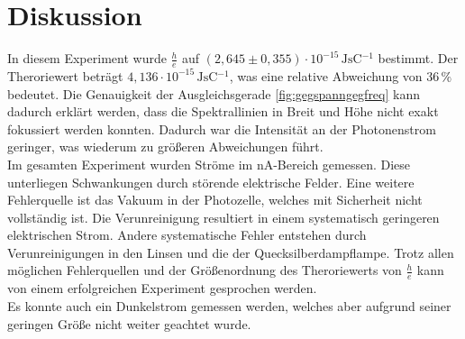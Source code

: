 \section{Diskussion}
\label{sec:Diskussion}

In diesem Experiment wurde $ \frac{h}{e}$ auf $(2,645 \pm 0,355) \cdot 10^{-15} \,\si{\joule\second\coulomb^{-1}}$ bestimmt.
Der Theroriewert beträgt $4,136 \cdot 10^{-15} \,\si{\joule\second\coulomb^{-1}}$, was eine relative Abweichung von $36 \, \%$ bedeutet. Die Genauigkeit der Ausgleichsgerade \autoref{fig:gegspanngegfreq} kann dadurch erklärt werden, dass die Spektrallinien in Breit und Höhe nicht exakt fokussiert werden konnten.
Dadurch war die Intensität an der Photonenstrom geringer, was wiederum zu größeren Abweichungen führt. \\

Im gesamten Experiment wurden Ströme im $\unit{\nano\ampere}$-Bereich gemessen. Diese unterliegen Schwankungen durch störende elektrische Felder.
Eine weitere Fehlerquelle ist das Vakuum in der Photozelle, welches mit Sicherheit nicht vollständig ist. Die Verunreinigung resultiert in einem systematisch geringeren elektrischen Strom.
Andere systematische Fehler entstehen durch Verunreinigungen in den Linsen und die der Quecksilberdampflampe. Trotz allen möglichen Fehlerquellen und der Größenordnung des Theroriewerts von $\frac{h}{e}$ kann von einem erfolgreichen Experiment gesprochen werden. \\
Es konnte auch ein Dunkelstrom gemessen werden, welches aber aufgrund seiner geringen Größe nicht weiter geachtet wurde.\\